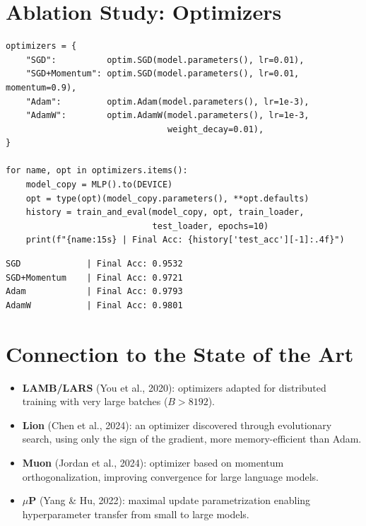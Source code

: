 \section{Ablation Study: Optimizers}
\label{sec:ablation_optim}

\begin{codeblock}[title=\textbf{Optimizer Comparison on MNIST}]
\begin{verbatim}
optimizers = {
    "SGD":          optim.SGD(model.parameters(), lr=0.01),
    "SGD+Momentum": optim.SGD(model.parameters(), lr=0.01, momentum=0.9),
    "Adam":         optim.Adam(model.parameters(), lr=1e-3),
    "AdamW":        optim.AdamW(model.parameters(), lr=1e-3,
                                weight_decay=0.01),
}

for name, opt in optimizers.items():
    model_copy = MLP().to(DEVICE)
    opt = type(opt)(model_copy.parameters(), **opt.defaults)
    history = train_and_eval(model_copy, opt, train_loader,
                             test_loader, epochs=10)
    print(f"{name:15s} | Final Acc: {history['test_acc'][-1]:.4f}")
\end{verbatim}
\end{codeblock}

\begin{codeoutput}
\begin{verbatim}
SGD             | Final Acc: 0.9532
SGD+Momentum    | Final Acc: 0.9721
Adam            | Final Acc: 0.9793
AdamW           | Final Acc: 0.9801
\end{verbatim}
\end{codeoutput}

\section{Connection to the State of the Art}
\label{sec:sota_optim}

\begin{sota}
\begin{itemize}
\item \textbf{LAMB/LARS} (You et al., 2020): optimizers adapted for distributed training with very large batches ($B > 8192$).
\item \textbf{Lion} (Chen et al., 2024): an optimizer discovered through evolutionary search, using only the sign of the gradient, more memory-efficient than Adam.
\item \textbf{Muon} (Jordan et al., 2024): optimizer based on momentum orthogonalization, improving convergence for large language models.
\item \textbf{$\mu$P} (Yang \& Hu, 2022): maximal update parametrization enabling hyperparameter transfer from small to large models.
\end{itemize}
\end{sota}

